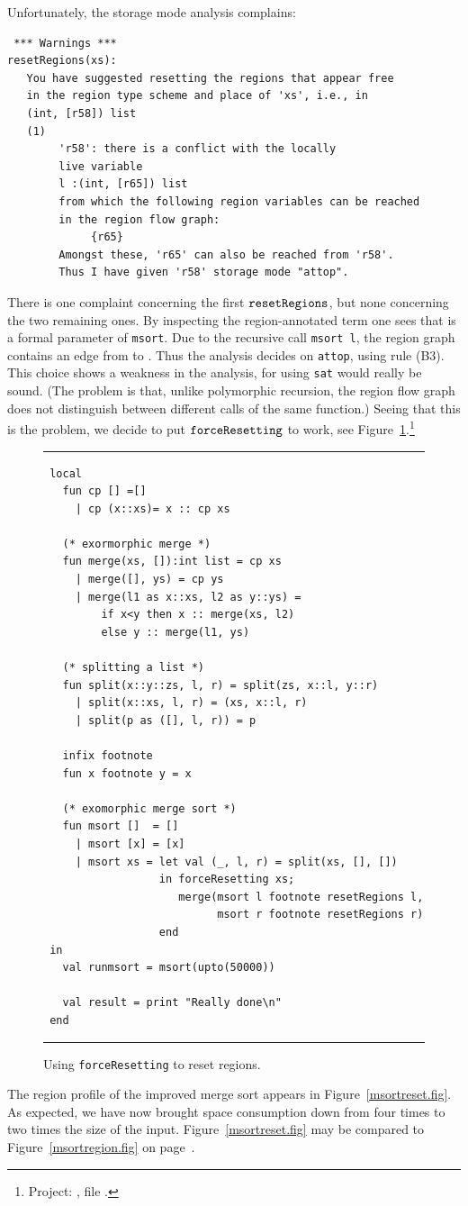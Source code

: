 \documentclass[12pt]{book}
\begin{document}
Unfortunately, the storage mode analysis complains:
\begin{verbatim}
 *** Warnings ***
resetRegions(xs): 
   You have suggested resetting the regions that appear free 
   in the region type scheme and place of 'xs', i.e., in
   (int, [r58]) list
   (1)                                                    
        'r58': there is a conflict with the locally
        live variable
        l :(int, [r65]) list
        from which the following region variables can be reached 
        in the region flow graph:
             {r65}
        Amongst these, 'r65' can also be reached from 'r58'.
        Thus I have given 'r58' storage mode "attop".
\end{verbatim}
There is one complaint
concerning the first $\hbox{\tt resetRegions}$, but none concerning the two remaining
ones.  By inspecting the region-annotated term
one sees that  is a formal parameter of
{\tt msort}.  Due to the recursive call {\tt msort l}, the region
graph contains an edge from  to . Thus the
analysis decides on {\tt attop}, using rule (B3). This choice shows a weakness
in the analysis, for using {\tt sat} would really be sound. (The
problem is that, unlike polymorphic recursion, the region flow graph
does not distinguish between different calls of the same function.)
Seeing that this is the problem, we decide to put $\hbox{\tt forceResetting}$ to work,
see Figure~\ref{force.fig}.\footnote{Project:   , file
  .} 
\begin{figure}
\hrule\medskip
\begin{verbatim}
 local
   fun cp [] =[]
     | cp (x::xs)= x :: cp xs

   (* exormorphic merge *)
   fun merge(xs, []):int list = cp xs
     | merge([], ys) = cp ys
     | merge(l1 as x::xs, l2 as y::ys) = 
         if x<y then x :: merge(xs, l2) 
         else y :: merge(l1, ys)

   (* splitting a list *)
   fun split(x::y::zs, l, r) = split(zs, x::l, y::r)
     | split(x::xs, l, r) = (xs, x::l, r)
     | split(p as ([], l, r)) = p

   infix footnote
   fun x footnote y = x

   (* exomorphic merge sort *)
   fun msort []  = []
     | msort [x] = [x]
     | msort xs = let val (_, l, r) = split(xs, [], [])
                  in forceResetting xs;
                     merge(msort l footnote resetRegions l, 
                           msort r footnote resetRegions r)
                  end
 in
   val runmsort = msort(upto(50000))

   val result = print "Really done\n"
 end
\end{verbatim}
\caption{Using {\tt forceResetting} to reset regions.}
\medskip
\hrule
\label{force.fig}
\end{figure}
The region profile of the improved merge sort appears in 
Figure~\ref{msortreset.fig}. As expected, we have
now brought space consumption down from four times to two times the size of the
input. 
Figure~\ref{msortreset.fig}
may be compared to Figure~\ref{msortregion.fig} on page~\pageref{msortregion.fig}.
\end{document}
